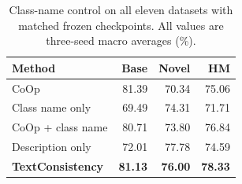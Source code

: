 \begin{table}[t]
\centering
\caption{Class-name control on all eleven datasets with matched frozen checkpoints. All values are three-seed macro averages (\%).}
\label{tab:class_name_control}
\small
\setlength{\tabcolsep}{7pt}
\begin{tabular}{lrrr}
\toprule
Method & Base & Novel & HM \\
\midrule
CoOp & 81.39 & 70.34 & 75.06 \\
Class name only & 69.49 & 74.31 & 71.71 \\
CoOp + class name & 80.71 & 73.80 & 76.84 \\
Description only & 72.01 & 77.78 & 74.59 \\
\textbf{TextConsistency} & \textbf{81.13} & \textbf{76.00} & \textbf{78.33} \\
\bottomrule
\end{tabular}
\end{table}
